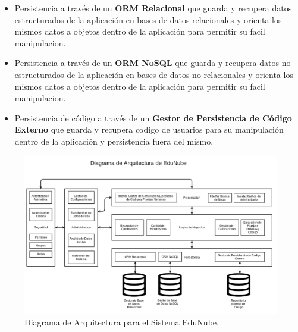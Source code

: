 \begin{itemize}
    \begin{itemize}
    	\item Persistencia a través de un \textbf{ORM Relacional} que guarda y recupera datos estructurados de la aplicación en bases de datos relacionales y orienta los mismos datos a objetos dentro de la aplicación para permitir su facil manipulacion.
        \item Persistencia a través de un \textbf{ORM NoSQL} que guarda y recupera datos no estructurados de la aplicación en bases de datos no relacionales y orienta los mismos datos a objetos dentro de la aplicación para permitir su facil manipulacion.
        \item Persistencia de código a través de un \textbf{Gestor de Persistencia de Código Externo} que guarda y recupera codigo de usuarios para su manipulación dentro de la aplicación y persistencia fuera del mismo.
    \end{itemize}
\end{itemize}

\begin{landscape}
	\begin{figure}
	  \begin{center}
	    \includegraphics[width=1.0\textwidth]{Figures/arq_en.png}
	  \end{center}
	  \caption{Diagrama de Arquitectura para el Sistema EduNube.}
	  \label{arq_en}
	\end{figure}

\end{landscape}

